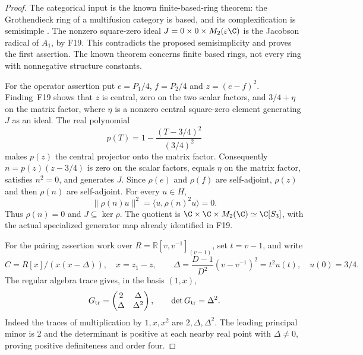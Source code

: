 \documentclass[11pt,a4paper]{article}
\newcommand{\R}{\mathbb R}
\newcommand{\fid}[1]{\textsf{#1}}\newcommand{\gate}[1]{\textsf{#1}}
\theoremstyle{named}\newtheorem{finding}{Finding}[section]
\theoremstyle{definition}\newtheorem{definition}[finding]{Definition}
\theoremstyle{remark}\newtheorem{remark}[finding]{Remark}
\begin{document}
\begin{proof}
The categorical input is the known finite-based-ring theorem:
the Grothendieck ring of a multifusion category is based, and its
complexification is semisimple
\cite[Definition~1.42.2 and Proposition~1.42.4, pp.~76--77;
Corollary~1.43.5, p.~80]{EGNO2009}.
The nonzero square-zero ideal
$J=0\times0\times M_2(\varepsilon\C)$ is the Jacobson radical
of $A_1$, by \fid{F19}. This contradicts the proposed semisimplicity
and proves the first assertion. The known theorem concerns finite
based rings, not every ring with nonnegative structure constants.

For the operator assertion put $e=P_1/4$, $f=P_2/4$ and
$z=(e-f)^2$. Finding~\fid{F19} shows that $z$ is central, zero
on the two scalar factors, and $3/4+\eta$ on the matrix factor,
where $\eta$ is a nonzero central square-zero element generating
$J$ as an ideal. The real polynomial
\[
 p(T)=1-\frac{(T-3/4)^2}{(3/4)^2}
\]
makes $p(z)$ the central projector onto the matrix factor.
Consequently $n=p(z)(z-3/4)$ is zero on the scalar factors,
equals $\eta$ on the matrix factor, satisfies $n^2=0$, and
generates $J$. Since $\rho(e)$ and $\rho(f)$ are self-adjoint,
$\rho(z)$ and then $\rho(n)$ are self-adjoint. For every $u\in H$,
\[
 \|\rho(n)u\|^2=\langle u,\rho(n)^2u\rangle=0.
\]
Thus $\rho(n)=0$ and $J\subseteq\ker\rho$. The quotient is
$\C\times\C\times M_2(\C)\simeq\C[S_3]$, with the actual
specialized generator map already identified in \fid{F19}.

For the pairing assertion work over
$R=\R[v,v^{-1}]_{(v-1)}$, set $t=v-1$, and write
\[
 C=R[x]/(x(x-\Delta)),\quad x=z_1-z,\qquad
 \Delta=\frac{D-1}{D^2}(v-v^{-1})^2=t^2u(t),\quad u(0)=3/4.
\]
The regular algebra trace gives, in the basis $(1,x)$,
\[
 G_{\rm tr}=\begin{pmatrix}2&\Delta\\\Delta&\Delta^2\end{pmatrix},
 \qquad \det G_{\rm tr}=\Delta^2.
\]
Indeed the traces of multiplication by $1,x,x^2$ are
$2,\Delta,\Delta^2$. The leading principal minor is 2 and the
determinant is positive at each nearby real point with
$\Delta\ne0$, proving positive definiteness and order four.


\end{proof}
\end{document}
